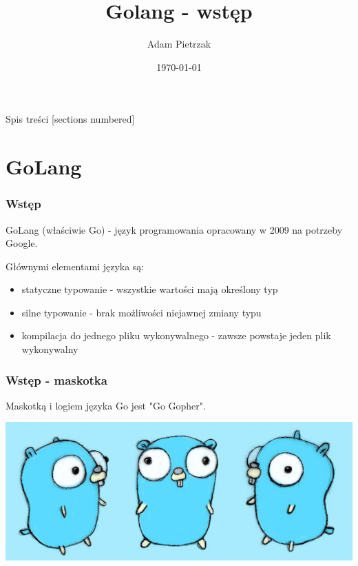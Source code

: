 \documentclass[10pt]{beamer}
\title{Golang - wstęp}
\date{\today}
\author{Adam Pietrzak}
\institute{}
\begin{document}
\maketitle

\begin{frame}{Spis treści}
  [sections numbered]
  \tableofcontents%
\end{frame}

\section[GoLang]{GoLang}
\begin{frame}[fragile]
    \frametitle{Wstęp}
    GoLang (właściwie Go) - język programowania opracowany w 2009 na potrzeby Google.

    Głównymi elementami języka są:
    \begin{itemize}
        \item statyczne typowanie - wszystkie wartości mają określony typ
        \item silne typowanie - brak możliwości niejawnej zmiany typu
        \item kompilacja do jednego pliku wykonywalnego - zawsze powstaje jeden plik
        wykonywalny
    \end{itemize}
\end{frame}

\begin{frame}[fragile]
    \frametitle{Wstęp - maskotka}
    Maskotką i logiem języka Go jest "Go Gopher".

    \begin{center}
        \includegraphics[scale=5]{gopher.jpg}
    \end{center}
\end{frame}
\end{document}
